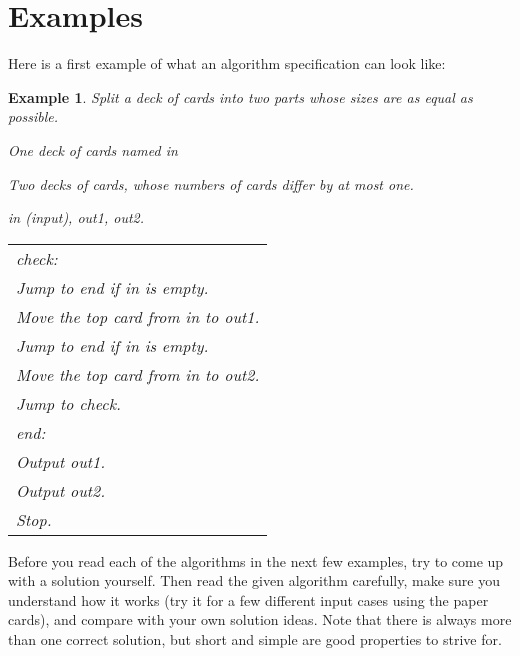 \documentclass[a4paper,twoside]{tufte-handout}
\newtheorem{example}{Example}
\newcommand\lbl[1]{\hspace{-1em}\emph{#1:}}
\begin{document}
\clearpage

\section{Examples}\label{sec-examp}

Here is a first example of what an algorithm specification can look like:

\begin{example}
  Split a deck of cards into two parts whose sizes are as equal as possible.
  \begin{description}
  \item[Input:] One deck of cards named \emph{in}
  \item[Output:] Two decks of cards,
    whose numbers of cards differ by at most one.
  \item[Decks:] \emph{in} (input), \emph{out1}, \emph{out2}.
 \item[Algorithm:]
  \item\normalfont
    \begin{tabular}{l}
      \lbl{check}\\
      Jump to \emph{end} if \emph{in} is empty.\\
      Move the top card from \emph{in} to \emph{out1}.\\
      Jump to \emph{end} if \emph{in} is empty.\\
      Move the top card from \emph{in} to \emph{out2}.\\
      Jump to \emph{check}.\\
      \lbl{end}\\
      Output \emph{out1}.\\
      Output \emph{out2}.\\
      Stop.
    \end{tabular}
  \end{description}
\end{example}

Before you read each of the algorithms in the next few examples, try
to come up with a solution yourself. Then read the given algorithm
carefully, make sure you understand how it works (try it for a few
different input cases using the paper cards), and compare with your
own solution ideas. Note that there is always more than one correct
solution, but short and simple are good properties to strive for.
\end{document}
